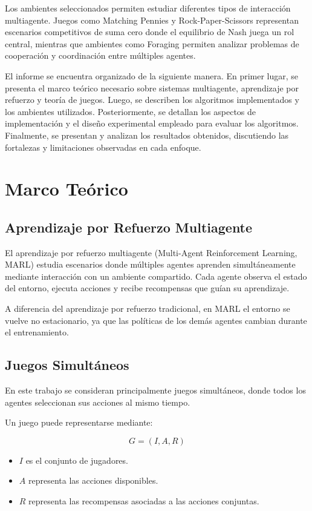 \documentclass[letterpaper,12pt]{article} %
\begin{document}
Los ambientes seleccionados permiten estudiar diferentes tipos de interacción multiagente. Juegos como Matching Pennies y Rock-Paper-Scissors representan escenarios competitivos de suma cero donde el equilibrio de Nash juega un rol central, mientras que ambientes como Foraging permiten analizar problemas de cooperación y coordinación entre múltiples agentes.

El informe se encuentra organizado de la siguiente manera. En primer lugar, se presenta el marco teórico necesario sobre sistemas multiagente, aprendizaje por refuerzo y teoría de juegos. Luego, se describen los algoritmos implementados y los ambientes utilizados. Posteriormente, se detallan los aspectos de implementación y el diseño experimental empleado para evaluar los algoritmos. Finalmente, se presentan y analizan los resultados obtenidos, discutiendo las fortalezas y limitaciones observadas en cada enfoque.

\section{Marco Teórico}

\subsection{Aprendizaje por Refuerzo Multiagente}

El aprendizaje por refuerzo multiagente (Multi-Agent Reinforcement Learning, MARL) estudia escenarios donde múltiples agentes aprenden simultáneamente mediante interacción con un ambiente compartido. Cada agente observa el estado del entorno, ejecuta acciones y recibe recompensas que guían su aprendizaje.

A diferencia del aprendizaje por refuerzo tradicional, en MARL el entorno se vuelve no estacionario, ya que las políticas de los demás agentes cambian durante el entrenamiento.

\subsection{Juegos Simultáneos}

En este trabajo se consideran principalmente juegos simultáneos, donde todos los agentes seleccionan sus acciones al mismo tiempo.

Un juego puede representarse mediante:

\[
G = (I, A, R)
\]

\begin{itemize}
    \item $I$ es el conjunto de jugadores.
    \item $A$ representa las acciones disponibles.
    \item $R$ representa las recompensas asociadas a las acciones conjuntas.
\end{itemize}
\end{document}

